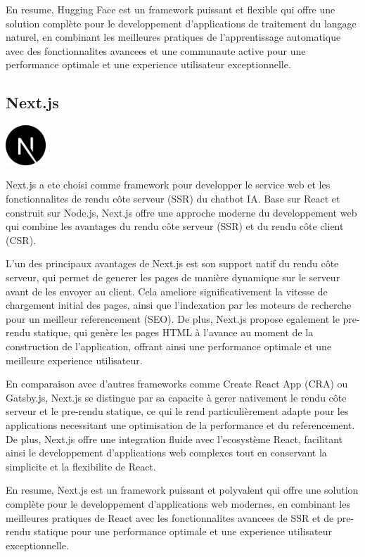 \documentclass[a4paper, 11pt, openany]{report}
\begin{document}
En resume, Hugging Face est un framework puissant et flexible qui offre une solution complète pour le developpement d'applications de traitement du langage naturel, en combinant les meilleures pratiques de l'apprentissage automatique avec des fonctionnalites avancees et une communaute active pour une performance optimale et une experience utilisateur exceptionnelle.



\subsection{Next.js}
\begin{center}
\includegraphics[height=1.5cm]{assets/images/next.png}
\end{center}

Next.js a ete choisi comme framework pour developper le service web et les fonctionnalites de rendu côte serveur (SSR) du chatbot IA. Base sur React et construit sur Node.js, Next.js offre une approche moderne du developpement web qui combine les avantages du rendu côte serveur (SSR) et du rendu côte client (CSR). 

L'un des principaux avantages de Next.js est son support natif du rendu côte serveur, qui permet de generer les pages de manière dynamique sur le serveur avant de les envoyer au client. Cela ameliore significativement la vitesse de chargement initial des pages, ainsi que l'indexation par les moteurs de recherche pour un meilleur referencement (SEO). De plus, Next.js propose egalement le pre-rendu statique, qui genère les pages HTML à l'avance au moment de la construction de l'application, offrant ainsi une performance optimale et une meilleure experience utilisateur.

En comparaison avec d'autres frameworks comme Create React App (CRA) ou Gatsby.js, Next.js se distingue par sa capacite à gerer nativement le rendu côte serveur et le pre-rendu statique, ce qui le rend particulièrement adapte pour les applications necessitant une optimisation de la performance et du referencement. De plus, Next.js offre une integration fluide avec l'ecosystème React, facilitant ainsi le developpement d'applications web complexes tout en conservant la simplicite et la flexibilite de React.

En resume, Next.js est un framework puissant et polyvalent qui offre une solution complète pour le developpement d'applications web modernes, en combinant les meilleures pratiques de React avec les fonctionnalites avancees de SSR et de pre-rendu statique pour une performance optimale et une experience utilisateur exceptionnelle.
\end{document}
